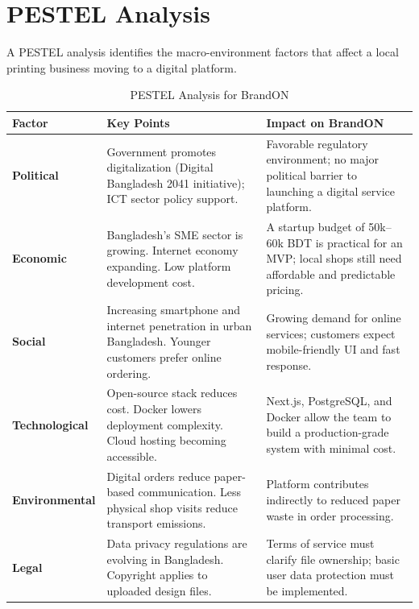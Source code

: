 \documentclass[12pt,a4paper]{report}
\begin{document}
\section{PESTEL Analysis}

A PESTEL analysis identifies the macro-environment factors that affect a local printing business moving to a digital platform.

\begin{table}[htbp]
  \centering
  \caption{PESTEL Analysis for BrandON}
  \small
  \renewcommand{\arraystretch}{1.2}
  \begin{tabularx}{\textwidth}{@{}L{3cm} X X@{}}
    \toprule
    \textbf{Factor} & \textbf{Key Points} & \textbf{Impact on BrandON} \\
    \midrule
    \textbf{Political}
      & Government promotes digitalization (Digital Bangladesh 2041 initiative); ICT sector policy support.
      & Favorable regulatory environment; no major political barrier to launching a digital service platform. \\
    \midrule
    \textbf{Economic}
      & Bangladesh's SME sector is growing. Internet economy expanding. Low platform development cost.
      & A startup budget of 50k--60k BDT is practical for an MVP; local shops still need affordable and predictable pricing. \\
    \midrule
    \textbf{Social}
      & Increasing smartphone and internet penetration in urban Bangladesh. Younger customers prefer online ordering.
      & Growing demand for online services; customers expect mobile-friendly UI and fast response. \\
    \midrule
    \textbf{Technological}
      & Open-source stack reduces cost. Docker lowers deployment complexity. Cloud hosting becoming accessible.
      & Next.js, PostgreSQL, and Docker allow the team to build a production-grade system with minimal cost. \\
    \midrule
    \textbf{Environmental}
      & Digital orders reduce paper-based communication. Less physical shop visits reduce transport emissions.
      & Platform contributes indirectly to reduced paper waste in order processing. \\
    \midrule
    \textbf{Legal}
      & Data privacy regulations are evolving in Bangladesh. Copyright applies to uploaded design files.
      & Terms of service must clarify file ownership; basic user data protection must be implemented. \\
    \bottomrule
  \end{tabularx}
  \normalsize
  \renewcommand{\arraystretch}{1}
\end{table}
\end{document}
